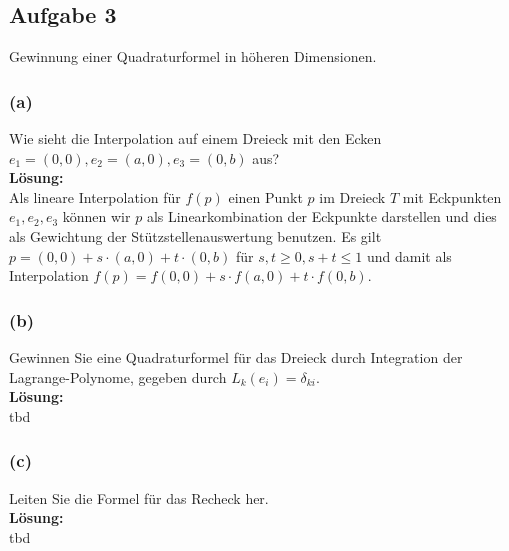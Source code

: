 \documentclass[11pt,a4paper,ngerman]{article}
\begin{document}
\subsection*{Aufgabe 3}

Gewinnung einer Quadraturformel in höheren Dimensionen.

\subsubsection*{(a)}
Wie sieht die Interpolation auf einem Dreieck mit den Ecken $e_1 = (0,0), e_2 = (a,0), e_3 = (0,b)$ aus?\\

\textbf{Lösung:}\\
Als lineare Interpolation für $f(p)$ einen Punkt $p$ im Dreieck $T$ mit Eckpunkten $e_1, e_2, e_3$ können wir
$p$ als Linearkombination der Eckpunkte darstellen und dies als Gewichtung der Stützstellenauswertung benutzen.
Es gilt $p = (0,0) + s \cdot (a,0) + t \cdot (0,b)$ für $s,t \geq 0, s + t \leq 1$ und damit als Interpolation
$f(p) = f(0,0) + s \cdot f(a,0) + t \cdot f(0,b)$.

\subsubsection*{(b)}
Gewinnen Sie eine Quadraturformel für das Dreieck durch Integration der Lagrange-Polynome, gegeben
durch $L_k(e_i) = \delta_{ki}$.\\

\textbf{Lösung:}\\
tbd

\subsubsection*{(c)}
Leiten Sie die Formel für das Recheck her.\\

\textbf{Lösung:}\\
tbd


\label{LastPage}
\end{document}
